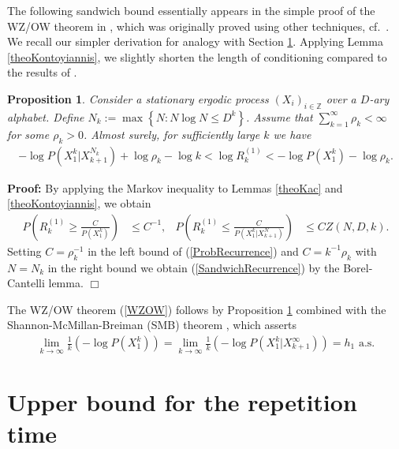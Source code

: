 \documentclass[a4paper,12pt]{article}
\newcommand{\okra}[1]{\left( #1 \right)}
\newcommand{\klam}[1]{\left\{ #1 \right\}}
\newtheorem{proposition}{Proposition}
\newenvironment*{proof}{\begin{trivlist}\item[]
\noindent\textbf{Proof:}}{$\Box$\par\end{trivlist}}
\begin{document}
The following sandwich bound essentially appears in the simple proof
of the WZ/OW theorem in \cite[Theorem 9.12]{Debowski21}, which was
originally proved using other techniques, cf.\
\cite{WynerZiv89,OrnsteinWeiss93}. We recall our simpler derivation
for analogy with Section \ref{secRepetition}. Applying Lemma
\ref{theoKontoyiannis}, we slightly shorten the length of conditioning
compared to the results of \cite{Debowski18b}.
\begin{proposition}
  \label{theoSandwichRecurrence}
  Consider a stationary ergodic process $(X_i)_{i\in\mathbb{Z}}$ over
  a $D$-ary alphabet. Define $N_k:=\max\klam{N: N\log N\le D^k}$.
  Assume that $\sum_{k=1}^\infty \rho_k<\infty$ for some $\rho_k>0$.
  Almost surely, for sufficiently large $k$ we have
\begin{align}
  \label{SandwichRecurrence}
  -\log P(X_1^k|X_{k+1}^{N_k})
  +\log \rho_k-\log k
  <
  \log R^{(1)}_k
  <
  -\log P(X_1^k)
  -\log \rho_k
  .
\end{align}
\end{proposition}
\begin{proof}
  By applying the Markov inequality to Lemmas \ref{theoKac} and
  \ref{theoKontoyiannis}, we obtain
\begin{align}
  \label{ProbRecurrence}
  P\okra{R^{(1)}_k\ge \frac{C}{P(X_1^k)}}
  &\le C^{-1}
  ,
  &
  P\okra{R^{(1)}_k\le \frac{C}{P(X_1^k|X_{k+1}^{N})}}
  &\le C Z(N,D,k)
  .
\end{align}
Setting $C=\rho_k^{-1}$ in the left bound of (\ref{ProbRecurrence})
and $C=k^{-1}\rho_k$ with $N=N_k$ in the right bound we obtain
(\ref{SandwichRecurrence}) by the Borel-Cantelli lemma.
\end{proof}

The WZ/OW theorem (\ref{WZOW}) follows by Proposition
\ref{theoSandwichRecurrence} combined with the
Shannon-McMillan-Breiman (SMB) theorem \cite{Shannon48, Breiman57},
which asserts
\begin{align}
  \label{SMB}
  \lim_{k\to\infty}
  \frac{1}{k}\okra{-\log P(X_1^k)}=
  \lim_{k\to\infty}
  \frac{1}{k}\okra{-\log P(X_1^k|X_{k+1}^\infty)}=
  h_1 \text{ a.s.}
\end{align}

\section{Upper bound for the repetition time}
\label{secRepetition}
\end{document}
